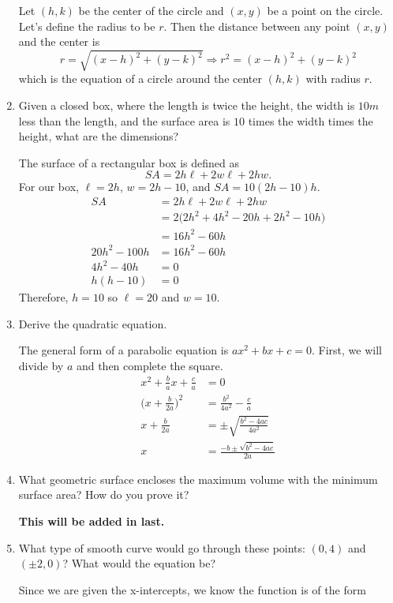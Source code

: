\begin{enumerate}
  Let \((h, k)\) be the center of the circle and \((x, y)\) be a point on the
  circle.
  Let's define the radius to be \(r\).
  Then the distance between any point \((x, y)\) and the center is
  \[
  r = \sqrt{(x - h)^2 + (y - k)^2}\Rightarrow r^2 = (x - h)^2 + (y - k)^2
  \]
  which is the equation of a circle around the center \((h, k)\) with radius
  \(r\).
\item
  Given a closed box, where the length is twice the height, the width is \(10m\)
  less than the length, and the surface area is \(10\) times the width times the
  height, what are the dimensions?
  \par\smallskip
  The surface of a rectangular box is defined as
  \[
  SA = 2h\ell + 2w\ell + 2hw.
  \]
  For our box, \(\ell = 2h\), \(w = 2h - 10\), and \(SA = 10(2h - 10)h\).
  \begin{align*}
    SA &= 2h\ell + 2w\ell + 2hw\\
       &= 2\big(2h^2 + 4h^2 - 20h + 2h^2 - 10h\big)\\
       &= 16h^2 - 60h\\
    20h^2 - 100h &= 16h^2 - 60h\\
    4h^2 - 40h &= 0\\
    h(h - 10) &= 0
  \end{align*}
  Therefore, \(h = 10\) so \(\ell = 20\) and \(w = 10\).
\item
  Derive the quadratic equation.
  \par\smallskip
  The general form of a parabolic equation is \(ax^2 + bx + c = 0\).
  First, we will divide by \(a\) and then complete the square.
  \begin{align*}
    x^2 + \frac{b}{a}x + \frac{c}{a} &= 0\\
    \Big(x + \frac{b}{2a}\Big)^2 &= \frac{b^2}{4a^2} - \frac{c}{a}\\
    x + \frac{b}{2a} &= \pm\sqrt{\frac{b^2 - 4ac}{4a^2}}\\
    x &= \frac{-b\pm\sqrt{b^2 - 4ac}}{2a}
  \end{align*}
\item
  What geometric surface encloses the maximum volume with the minimum surface
  area?
  How do you prove it?
  \par\smallskip
  \textbf{This will be added in last.}
\item
  What type of smooth curve would go through these points: \((0, 4)\) and
  \((\pm 2, 0)\)?
  What would the equation be?
  \par\smallskip
  Since we are given the x-intercepts, we know the function is of the form

\end{enumerate}
